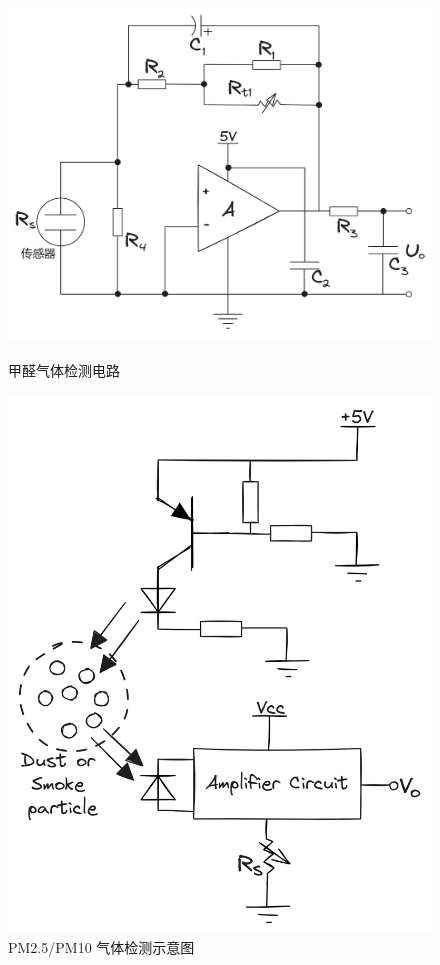 \documentclass[12pt,hyperref,a4paper,UTF8]{ctexart}
\begin{document}
\begin{figure}[htbp]
    \centering
    \begin{minipage}{0.45\textwidth}
        \centering
        \includegraphics[width =.8\textwidth]{figures/HCHO_sensor.png}
        \caption{甲醛气体检测电路}
        \label{HCHO_sensor}
    \end{minipage}
    \begin{minipage}{0.45\textwidth}
        \centering
        \includegraphics[width =.75\textwidth]{figures/PM_sensor.png}
        \caption{PM2.5/PM10 气体检测示意图}
        \label{PM_sensor}
    \end{minipage}
\end{figure}
\end{document}
